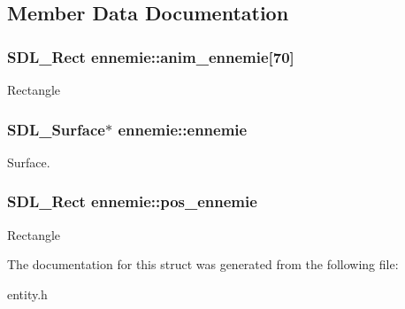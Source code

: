 \subsection{Member Data Documentation}
\subsubsection[{\texorpdfstring{anim\+\_\+ennemie}{anim_ennemie}}]{\setlength{\rightskip}{0pt plus 5cm}S\+D\+L\+\_\+\+Rect ennemie\+::anim\+\_\+ennemie\mbox{[}70\mbox{]}}\hypertarget{structennemie_a662163dc7523a33432e465adf956f59d}{}\label{structennemie_a662163dc7523a33432e465adf956f59d}
Rectangle 
\subsubsection[{\texorpdfstring{ennemie}{ennemie}}]{\setlength{\rightskip}{0pt plus 5cm}S\+D\+L\+\_\+\+Surface$\ast$ ennemie\+::ennemie}\hypertarget{structennemie_aaae66281b643eb7d3ff0ecb277b750f8}{}\label{structennemie_aaae66281b643eb7d3ff0ecb277b750f8}
Surface. 
\subsubsection[{\texorpdfstring{pos\+\_\+ennemie}{pos_ennemie}}]{\setlength{\rightskip}{0pt plus 5cm}S\+D\+L\+\_\+\+Rect ennemie\+::pos\+\_\+ennemie}\hypertarget{structennemie_a980be16769437d4adaa8be28e8ff922d}{}\label{structennemie_a980be16769437d4adaa8be28e8ff922d}
Rectangle 

The documentation for this struct was generated from the following file\+:\begin{DoxyCompactItemize}
\item 
entity.\+h\end{DoxyCompactItemize}
